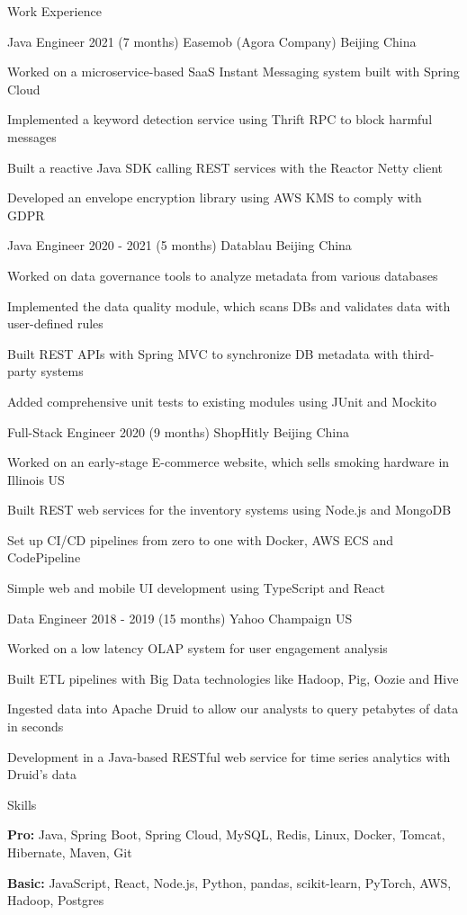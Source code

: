 \documentclass{resume} %
\begin{document}
\begin{rSection}{Work Experience}

\begin{rSubsection}
{Java Engineer} {2021 (7 months)} {Easemob (Agora Company)} {Beijing China}
\item Worked on a microservice-based SaaS Instant Messaging system built with Spring Cloud
\item Implemented a keyword detection service using Thrift RPC to block harmful messages
\item Built a reactive Java SDK calling REST services with the Reactor Netty client
\item Developed an envelope encryption library using AWS KMS to comply with GDPR
\end{rSubsection}

\begin{rSubsection}
{Java Engineer} {2020 - 2021 (5 months)} {Datablau} {Beijing China}
\item Worked on data governance tools to analyze metadata from various databases
\item Implemented the data quality module, which scans DBs and validates data with user-defined rules
\item Built REST APIs with Spring MVC to synchronize DB metadata with third-party systems
\item Added comprehensive unit tests to existing modules using JUnit and Mockito
\end{rSubsection}

\begin{rSubsection}
{Full-Stack Engineer} {2020 (9 months)} {ShopHitly} {Beijing China}
\item Worked on an early-stage E-commerce website, which sells smoking hardware in Illinois US
\item Built REST web services for the inventory systems using Node.js and MongoDB
\item Set up CI/CD pipelines from zero to one with Docker, AWS ECS and CodePipeline
\item Simple web and mobile UI development using TypeScript and React
\end{rSubsection}

\begin{rSubsection}
{Data Engineer} {2018 - 2019 (15 months)} {Yahoo} {Champaign US}
\item Worked on a low latency OLAP system for user engagement analysis
\item Built ETL pipelines with Big Data technologies like Hadoop, Pig, Oozie and Hive
\item Ingested data into Apache Druid to allow our analysts to query petabytes of data in seconds
\item Development in a Java-based RESTful web service for time series analytics with Druid's data
\end{rSubsection}

\end{rSection}

\begin{skillSection}{Skills}
\item {\bf Pro:} Java, Spring Boot, Spring Cloud, MySQL, Redis, Linux, Docker, Tomcat, Hibernate, Maven, Git
\item {\bf Basic:} JavaScript, React, Node.js, Python, pandas, scikit-learn, PyTorch, AWS, Hadoop, Postgres
\end{skillSection}
\end{document}

